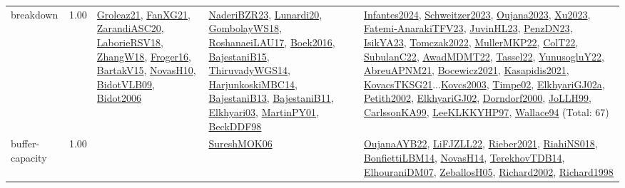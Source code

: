 {\begin{longtable}{p{3cm}r>{\raggedright\arraybackslash}p{6cm}>{\raggedright\arraybackslash}p{6cm}>{\raggedright\arraybackslash}p{8cm}}
\index{breakdown}\index{Concepts!breakdown}breakdown &  1.00 & \hyperref[detail:Groleaz21]{Groleaz21}, \hyperref[detail:FanXG21]{FanXG21}, \hyperref[detail:ZarandiASC20]{ZarandiASC20}, \hyperref[detail:LaborieRSV18]{LaborieRSV18}, \hyperref[detail:ZhangW18]{ZhangW18}, \hyperref[detail:Froger16]{Froger16}, \hyperref[detail:BartakV15]{BartakV15}, \hyperref[detail:NovasH10]{NovasH10}, \hyperref[detail:BidotVLB09]{BidotVLB09}, \hyperref[detail:Bidot2006]{Bidot2006} & \hyperref[detail:NaderiBZR23]{NaderiBZR23}, \hyperref[detail:Lunardi20]{Lunardi20}, \hyperref[detail:GombolayWS18]{GombolayWS18}, \hyperref[detail:RoshanaeiLAU17]{RoshanaeiLAU17}, \hyperref[detail:Boek2016]{Boek2016}, \hyperref[detail:BajestaniB15]{BajestaniB15}, \hyperref[detail:ThiruvadyWGS14]{ThiruvadyWGS14}, \hyperref[detail:HarjunkoskiMBC14]{HarjunkoskiMBC14}, \hyperref[detail:BajestaniB13]{BajestaniB13}, \hyperref[detail:BajestaniB11]{BajestaniB11}, \hyperref[detail:Elkhyari03]{Elkhyari03}, \hyperref[detail:MartinPY01]{MartinPY01}, \hyperref[detail:BeckDDF98]{BeckDDF98} & \hyperref[detail:Infantes2024]{Infantes2024}, \hyperref[detail:Schweitzer2023]{Schweitzer2023}, \hyperref[detail:Oujana2023]{Oujana2023}, \hyperref[detail:Xu2023]{Xu2023}, \hyperref[detail:Fatemi-AnarakiTFV23]{Fatemi-AnarakiTFV23}, \hyperref[detail:JuvinHL23]{JuvinHL23}, \hyperref[detail:PenzDN23]{PenzDN23}, \hyperref[detail:IsikYA23]{IsikYA23}, \hyperref[detail:Tomczak2022]{Tomczak2022}, \hyperref[detail:MullerMKP22]{MullerMKP22}, \hyperref[detail:ColT22]{ColT22}, \hyperref[detail:SubulanC22]{SubulanC22}, \hyperref[detail:AwadMDMT22]{AwadMDMT22}, \hyperref[detail:Tassel22]{Tassel22}, \hyperref[detail:YunusogluY22]{YunusogluY22}, \hyperref[detail:AbreuAPNM21]{AbreuAPNM21}, \hyperref[detail:Bocewicz2021]{Bocewicz2021}, \hyperref[detail:Kasapidis2021]{Kasapidis2021}, \hyperref[detail:KovacsTKSG21]{KovacsTKSG21}...\hyperref[detail:Kovcs2003]{Kovcs2003}, \hyperref[detail:Timpe02]{Timpe02}, \hyperref[detail:ElkhyariGJ02a]{ElkhyariGJ02a}, \hyperref[detail:Petith2002]{Petith2002}, \hyperref[detail:ElkhyariGJ02]{ElkhyariGJ02}, \hyperref[detail:Dorndorf2000]{Dorndorf2000}, \hyperref[detail:JoLLH99]{JoLLH99}, \hyperref[detail:CarlssonKA99]{CarlssonKA99}, \hyperref[detail:LeeKLKKYHP97]{LeeKLKKYHP97}, \hyperref[detail:Wallace94]{Wallace94} (Total: 67)\\
\index{buffer-capacity}\index{Concepts!buffer-capacity}buffer-capacity &  1.00 &  & \hyperref[detail:SureshMOK06]{SureshMOK06} & \hyperref[detail:OujanaAYB22]{OujanaAYB22}, \hyperref[detail:LiFJZLL22]{LiFJZLL22}, \hyperref[detail:Rieber2021]{Rieber2021}, \hyperref[detail:RiahiNS018]{RiahiNS018}, \hyperref[detail:BonfiettiLBM14]{BonfiettiLBM14}, \hyperref[detail:NovasH14]{NovasH14}, \hyperref[detail:TerekhovTDB14]{TerekhovTDB14}, \hyperref[detail:ElhouraniDM07]{ElhouraniDM07}, \hyperref[detail:ZeballosH05]{ZeballosH05}, \hyperref[detail:Richard2002]{Richard2002}, \hyperref[detail:Richard1998]{Richard1998}\\

\end{longtable}}
